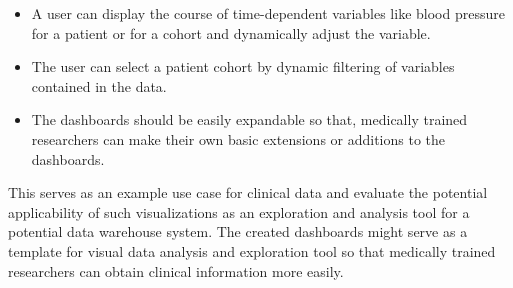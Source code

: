 \begin{itemize}
\item A user can display the course of time-dependent variables like blood pressure for a patient or for a cohort and dynamically adjust the variable.
\item The user can select a patient cohort by dynamic filtering of variables contained in the data.
\item The dashboards should be easily expandable so that, medically trained researchers can make their own basic extensions or additions to the dashboards.
\end{itemize}

This serves as an example use case for clinical data and evaluate the potential applicability of such visualizations as an exploration and analysis tool for a potential data warehouse system.
The created dashboards might serve as a template for visual data analysis and exploration tool so that medically trained researchers can obtain clinical information more easily.